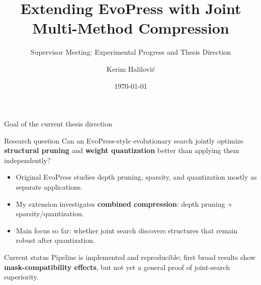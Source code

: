 \documentclass[aspectratio=169]{beamer}
\title[EvoPress Extension]{Extending EvoPress with Joint Multi-Method Compression}
\subtitle{Supervisor Meeting: Experimental Progress and Thesis Direction}
\author[Kerim Halilovi\'c]{Kerim Halilovi\'c}
\institute[TU Wien]{TU Wien, Vienna, Austria}
\date{\today}
\begin{document}
\begin{frame}
  \titlepage
\end{frame}


\begin{frame}{Goal of the current thesis direction}
\begin{block}{Research question}
Can an EvoPress-style evolutionary search jointly optimize \textbf{structural pruning} and \textbf{weight quantization} better than applying them independently?
\end{block}

\vspace{0.2cm}
\begin{itemize}
    \item Original EvoPress studies depth pruning, sparsity, and quantization mostly as separate applications.
    \item My extension investigates \textbf{combined compression}: depth pruning + sparsity/quantization.
    \item Main focus so far: whether joint search discovers structures that remain robust after quantization.
\end{itemize}

\vspace{0.25cm}
\begin{block}{Current status}
Pipeline is implemented and reproducible; first broad results show \textbf{mask-compatibility effects}, but not yet a general proof of joint-search superiority.
\end{block}
\end{frame}

\end{document}
